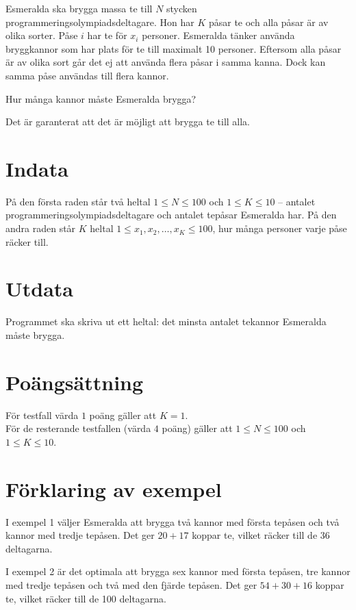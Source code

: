 Esmeralda ska brygga massa te till $N$ stycken programmeringsolympiadsdeltagare.
Hon har $K$ påsar te och alla påsar är av olika sorter.
Påse $i$ har te för $x_i$ personer.
Esmeralda tänker använda bryggkannor som har plats för te till maximalt 10 personer.
Eftersom alla påsar är av olika sort
går det ej att använda flera påsar i samma kanna.
Dock kan samma påse användas till flera kannor.

Hur många kannor måste Esmeralda brygga?

Det är garanterat att det är möjligt att brygga te till alla.

\section*{Indata}
På den första raden står två heltal $1 \le N \le 100$ och $1 \le K \le 10$
 -- antalet programmeringsolympiadsdeltagare och antalet tepåsar Esmeralda har.
På den andra raden står $K$ heltal $1 \le x_1, x_2, \dots, x_K \le 100$,
hur många personer varje påse räcker till.

\section*{Utdata}
Programmet ska skriva ut ett heltal: det minsta antalet tekannor Esmeralda måste brygga. 

\section*{Poängsättning}
För testfall värda $1$ poäng gäller att $K=1$. \\
För de resterande testfallen (värda $4$ poäng) gäller att $1\leq N\leq 100$ och $1\leq K\leq 10$.

\section*{Förklaring av exempel}
I exempel 1 väljer Esmeralda att brygga två kannor med första tepåsen 
och två kannor med tredje tepåsen. Det ger $20+17$ koppar te, vilket
räcker till de 36 deltagarna.

I exempel 2 är det optimala att brygga sex kannor med första tepåsen,
tre kannor med tredje tepåsen och två med den fjärde tepåsen.
Det ger $54+30+16$ koppar te, vilket räcker till de 100  deltagarna.
